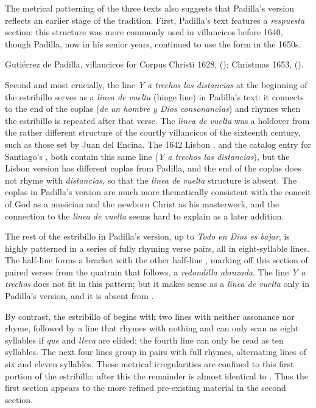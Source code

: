 The metrical patterning of the three texts also suggests that Padilla's version
reflects an earlier stage of the tradition.
First, Padilla's text features a \emph{respuesta} section: this structure was
more commonly used in villancicos before 1640, though Padilla, now in his senior
years, continued to use the form in the 1650s.%
\begin{Footnote}
    Gutiérrez de Padilla, villancicos for Corpus Christi 1628,  (); Christmas 1653,  ().
\end{Footnote}
Second and most crucially, the line \emph{Y a trechos las distancias} at the
beginning of the estribillo serves as a \emph{linea de vuelta} (hinge line) in
Padilla's text: it connects to the end of the coplas (\emph{de un hombre y Dios
consonancias}) and rhymes when the estribillo is repeated after that verse.
The \emph{linea de vuelta} was a holdover from the rather different structure of
the courtly villancicos of the sixteenth century, such as those set by Juan del
Encina.%
    \Autocite{Navarro:Metrica} %
The 1642 Lisbon , and the catalog entry for Santiago's
, both contain this same line (\emph{Y a trechos las distancias}),
but the Lisbon version has different coplas from Padilla, and the end of the
coplas does not rhyme with \emph{distancias}, so that the \emph{linea de vuelta}
structure is absent.
The  coplas in Padilla's version are much more thematically
consistent with the conceit of God as a musician and the newborn Christ as his
masterwork, and the connection to the \emph{linea de vuelta} seems hard to
explain as a later addition.

The rest of the estribillo in Padilla's version, up to \emph{Todo en Dios es
bajar}, is highly patterned in a series of fully rhyming verse pairs, all in
eight-syllable lines.
The half-line  forms a bracket with the other half-line
, marking off this section of paired verses from the
quatrain that follows, a \emph{redondilla abrazada}.
The line \emph{Y a trechos} does not fit in this pattern; but it makes sense as
a \emph{linea de vuelta} only in Padilla's version, and it is absent from
.

By contrast, the estribillo of  begins with two lines with
neither assonance nor rhyme, followed by a line that rhymes with nothing and can
only scan as eight syllables if \emph{que} and \emph{lleva} are elided; the
fourth line can only be read as ten syllables.
The next four lines group in pairs with full rhymes, alternating lines of six
and eleven syllables.
These metrical irregularities are confined to this first portion of the
estribillo; after this the remainder is almost identical to .
Thus the first section appears  to the more refined
pre-existing material in the second section.

